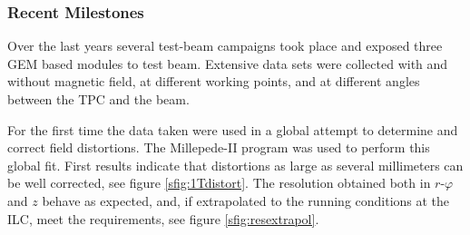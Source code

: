 \subsubsection{Recent Milestones}
Over the last years several test-beam campaigns took place and exposed three GEM based modules to test beam. Extensive data sets were collected with and without magnetic field, at different working points, and at different angles between the TPC and the beam.

For the first time the data taken were used in a global attempt to determine and correct field distortions. The Millepede-II \cite{millepedeNIM,millepedeWiki} program was used to perform this global fit. First results indicate that distortions as large as several millimeters can be well corrected, see figure \ref{sfig:1Tdistort}. The resolution obtained both in $r\text{-}\varphi$ and $z$ behave as expected, and, if extrapolated to the running conditions at the ILC, meet the requirements, see figure \ref{sfig:resextrapol}.

